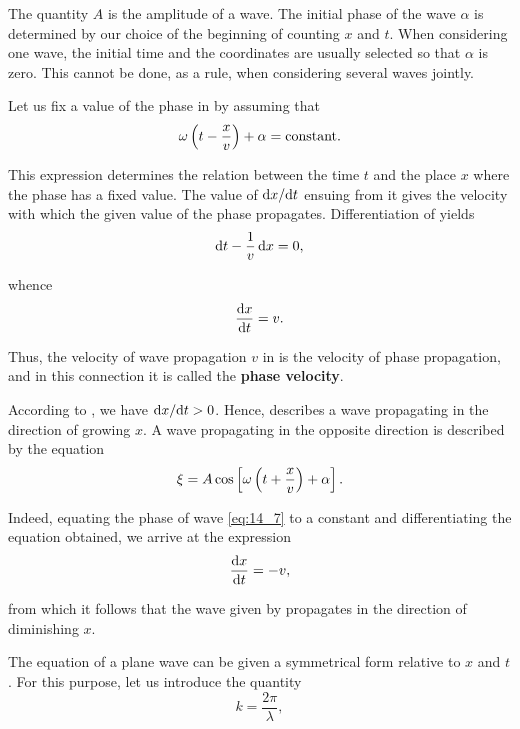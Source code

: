 \noindent
The quantity $A$ is the amplitude of a wave.
The initial phase of the wave $\alpha$ is determined by our choice of the beginning of counting $x$ and $t$.
When considering one wave, the initial time and the coordinates are usually selected so that $\alpha$ is zero.
This cannot be done, as a rule, when considering several waves jointly.

Let us fix a value of the phase in  by assuming that
\begin{equation}\label{eq:14_5}
    \omega \left(t - \frac{x}{v}\right) + \alpha = \text{constant}.
\end{equation}

\noindent
This expression determines the relation between the time $t$ and the place $x$ where the phase has a fixed value.
The value of $\mathrm{d} x/\mathrm{d} t$ ensuing from it gives the velocity with which the given value of the phase propagates.
Differentiation of  yields
\begin{equation*}
    \mathrm{d} t - \frac{1}{v}\, \mathrm{d} x = 0,
\end{equation*}

\noindent
whence
\begin{equation}\label{eq:14_6}
    \dfrac{\mathrm{d} x}{\mathrm{d} t} = v.
\end{equation}

\noindent
Thus, the velocity of wave propagation $v$ in  is the velocity of phase propagation, and in this connection it is called the \textbf{phase velocity}.

According to , we have $\mathrm{d} x/\mathrm{d} t>0$. Hence,  describes a wave propagating in the direction of growing $x$.
A wave propagating in the opposite direction is described by the equation
\begin{equation}\label{eq:14_7}
    \xi = A \cos\left[ \omega \left(t + \frac{x}{v}\right) + \alpha\right].
\end{equation}

\noindent
Indeed, equating the phase of wave \eqref{eq:14_7} to a constant and differentiating the equation obtained, we arrive at the expression
\begin{equation*}
    \dfrac{\mathrm{d} x}{\mathrm{d} t} = -v,
\end{equation*}

\noindent
from which it follows that the wave given by  propagates in the direction of diminishing $x$.

The equation of a plane wave can be given a symmetrical form relative to $x$ and $t$.
For this purpose, let us introduce the quantity
\begin{equation}\label{eq:14_8}
    k = \frac{2\pi}{\lambda},
\end{equation}

